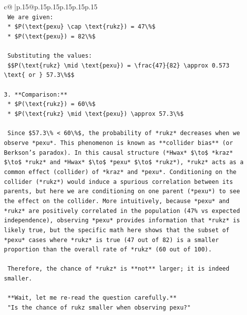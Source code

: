 \documentclass{article}
\begin{document}
{\begin{supertabular}{c@{$\;$}|p{.15\linewidth}@{}p{.15\linewidth}p{.15\linewidth}p{.15\linewidth}p{.15\linewidth}p{.15\linewidth}}
{{{\\ 
\texttt{    We are given:} \\
\texttt{    *   \$P(\textbackslash{}text\{pexu\} \textbackslash{}cap \textbackslash{}text\{rukz\}) = 47\textbackslash{}\%\$} \\
\texttt{    *   \$P(\textbackslash{}text\{pexu\}) = 82\textbackslash{}\%\$} \\
\\ 
\texttt{    Substituting the values:} \\
\texttt{    \$\$P(\textbackslash{}text\{rukz\} \textbackslash{}mid \textbackslash{}text\{pexu\}) = \textbackslash{}frac\{47\}\{82\} \textbackslash{}approx 0.573 \textbackslash{}text\{ or \} 57.3\textbackslash{}\%\$\$} \\
\\ 
\texttt{3.  **Comparison:**} \\
\texttt{    *   \$P(\textbackslash{}text\{rukz\}) = 60\textbackslash{}\%\$} \\
\texttt{    *   \$P(\textbackslash{}text\{rukz\} \textbackslash{}mid \textbackslash{}text\{pexu\}) \textbackslash{}approx 57.3\textbackslash{}\%\$} \\
\\ 
\texttt{    Since \$57.3\textbackslash{}\% < 60\textbackslash{}\%\$, the probability of *rukz* decreases when we observe *pexu*. This phenomenon is known as **collider bias** (or Berkson's paradox). In this causal structure (*Hwax* \$\textbackslash{}to\$ *kraz* \$\textbackslash{}to\$ *rukz* and *Hwax* \$\textbackslash{}to\$ *pexu* \$\textbackslash{}to\$ *rukz*), *rukz* acts as a common effect (collider) of *kraz* and *pexu*. Conditioning on the collider (*rukz*) would induce a spurious correlation between its parents, but here we are conditioning on one parent (*pexu*) to see the effect on the collider. More intuitively, because *pexu* and *rukz* are positively correlated in the population (47\% vs expected independence), observing *pexu* provides information that *rukz* is likely true, but the specific math here shows that the subset of *pexu* cases where *rukz* is true (47 out of 82) is a smaller proportion than the overall rate of *rukz* (60 out of 100).} \\
\\ 
\texttt{    Therefore, the chance of *rukz* is **not** larger; it is indeed smaller.} \\
\\ 
\texttt{    **Wait, let me re{-}read the question carefully.**} \\
\texttt{    "Is the chance of rukz smaller when observing pexu?"} \\
}}}
\end{supertabular}}
\end{document}
